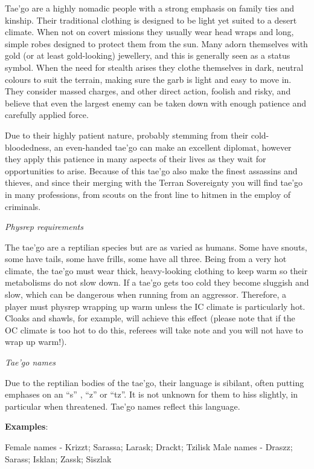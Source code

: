 \documentclass{scrbook}
\begin{document}
Tae'go are a highly nomadic people with a strong emphasis on family ties and kinship. Their traditional clothing is designed to be light yet suited to a desert climate. When not on covert missions they usually wear head wraps and long, simple robes designed to protect them from the sun. Many adorn themselves with gold (or at least gold-looking) jewellery, and this is generally seen as a status symbol. When the need for stealth arises they clothe themselves in dark, neutral colours to suit the terrain, making sure the garb is light and easy to move in. They consider massed charges, and other direct action, foolish and risky, and believe that even the largest enemy can be taken down with enough patience and carefully applied force.

Due to their highly patient nature, probably stemming from their cold-bloodedness, an even-handed tae'go can make an excellent diplomat, however they apply this patience in many aspects of their lives as they wait for opportunities to arise. Because of this tae'go also make the finest assassins and thieves, and since their merging with the Terran Sovereignty you will find tae'go in many professions, from scouts on the front line to hitmen in the employ of criminals.

\textit{Physrep requirements}

The tae'go are a reptilian species but are as varied as humans. Some have snouts, some have tails, some have frills, some have all three. Being from a very hot climate, the tae'go must wear thick, heavy-looking clothing to keep warm so their metabolisms do not slow down. If a tae'go gets too cold they become sluggish and slow, which can be dangerous when running from an aggressor. Therefore, a player must physrep wrapping up warm unless the IC climate is particularly hot. Cloaks and shawls, for example, will achieve this effect (please note that if the OC climate is too hot to do this, referees will take note and you will not have to wrap up warm!).

\textit{Tae'go names}

Due to the reptilian bodies of the tae'go, their language is sibilant, often putting emphases on an ``s'' , ``z'' or ``tz''. It is not unknown for them to hiss slightly, in particular when threatened. Tae'go names reflect this language.

\textbf{Examples}:

Female names - Krizzt; Sarassa; Larask; Drackt; Tzilisk Male names - Draszz; Sarass; Isklan; Zassk; Siszlak
\end{document}
